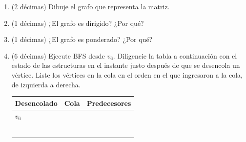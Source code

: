 
\begin{enumerate}
  \item (2 décimas) Dibuje el grafo que representa la matriz.
  \item (1 décimas) ¿El grafo es dirigido? ¿Por qué?
  \item (1 décimas) ¿El grafo es ponderado? ¿Por qué?
  \item (6 décimas) Ejecute BFS desde \(v_6\). Diligencie la tabla a continuación con el estado de las estructuras en el instante justo después de que se desencola un vértice. Liste los vértices en la cola en el orden en el que ingresaron a la cola, de izquierda a derecha.

\begin{center}
\begin{tabularx}{\textwidth}{|>{\centering\arraybackslash}X|>{\centering\arraybackslash}X|>{\centering\arraybackslash}X|}
\hline
\textbf{Desencolado} & \textbf{Cola} & \textbf{Predecesores} \\
\hline
$v_6$ \rule{0pt}{0.9cm} & & \\
\hline
\rule{0pt}{0.9cm} & & \\
\hline
\rule{0pt}{0.9cm} & & \\
\hline
\rule{0pt}{0.9cm} & & \\
\hline
\rule{0pt}{0.9cm} & & \\
\hline
\rule{0pt}{0.9cm} & & \\
\hline
\rule{0pt}{0.9cm} & & \\
\hline
\end{tabularx}
\end{center}
\end{enumerate}

\bigskip

